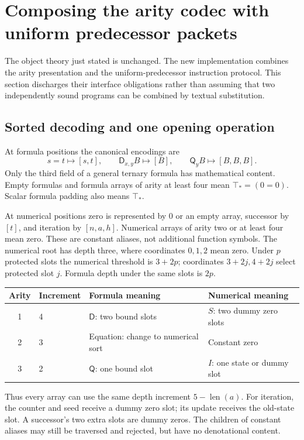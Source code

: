 \documentclass[11pt,letterpaper]{article}
\theoremstyle{definition}\newtheorem{definition}[theorem]{Definition}
\theoremstyle{remark}\newtheorem{remark}[theorem]{Remark}
\newcommand{\D}{\mathsf D}
\newcommand{\Q}{\mathsf Q}
\begin{document}
\section{Composing the arity codec with uniform predecessor packets}
\label{sec:checker}

The object theory just stated is unchanged. The new implementation
combines the arity presentation\cite{arity} and the uniform-predecessor
instruction protocol\cite{uniform}. This section discharges their
interface obligations rather than assuming that two independently sound
programs can be combined by textual substitution.

\subsection{Sorted decoding and one opening operation}

At formula positions the canonical encodings are
\[
 s=t\mapsto[s,t],\qquad \D_{x,y}B\mapsto[B],\qquad
 \Q_yB\mapsto[B,B,B].
\]
Only the third field of a general ternary formula has mathematical
content. Empty formulas and formula arrays of arity at least four mean
$\top_*=(0=0)$. Scalar formula padding also means $\top_*$.

At numerical positions zero is represented by $0$ or an empty array,
successor by $[t]$, and iteration by $[n,a,h]$. Numerical arrays of
arity two or at least four mean zero. These are constant aliases, not
additional function symbols. The numerical root has depth three, where
coordinates $0,1,2$ mean zero. Under $p$ protected slots the numerical
threshold is $3+2p$; coordinates $3+2j,4+2j$ select protected slot $j$.
Formula depth under the same slots is $2p$.

\begin{center}\small
\begin{tabular}{clll}
\toprule
Arity & Increment & Formula meaning & Numerical meaning\\
\midrule
1 &4& $\D$: two bound slots & $S$: two dummy zero slots\\
2 &3& Equation: change to numerical sort & Constant zero\\
3 &2& $\Q$: one bound slot & $I$: one state or dummy slot\\
\bottomrule
\end{tabular}
\end{center}
Thus every array can use the same depth increment
$5-\operatorname{len}(a)$. For iteration, the counter and seed receive
a dummy zero slot; its update receives the old-state slot. A successor's
two extra slots are dummy zeros. The children of constant aliases may
still be traversed and rejected, but have no denotational content.
\end{document}
